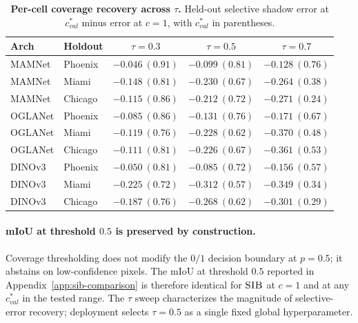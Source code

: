 \begin{table}[h]
\centering
\scriptsize
\setlength{\tabcolsep}{4pt}
\caption{\textbf{Per-cell coverage recovery across $\tau$.} Held-out selective shadow error at $c^*_{val}$ minus error at $c = 1$, with $c^*_{val}$ in parentheses.}
\label{tab:tau-percell}
\begin{tabular}{ll|ccc}
\toprule
\textbf{Arch} & \textbf{Holdout} & $\tau = 0.3$ & $\tau = 0.5$ & $\tau = 0.7$ \\
\midrule
MAMNet  & Phoenix & $-0.046\ (0.91)$ & $-0.099\ (0.81)$ & $-0.128\ (0.76)$ \\
MAMNet  & Miami   & $-0.148\ (0.81)$ & $-0.230\ (0.67)$ & $-0.264\ (0.38)$ \\
MAMNet  & Chicago & $-0.115\ (0.86)$ & $-0.212\ (0.72)$ & $-0.271\ (0.24)$ \\
OGLANet & Phoenix & $-0.085\ (0.86)$ & $-0.131\ (0.76)$ & $-0.171\ (0.67)$ \\
OGLANet & Miami   & $-0.119\ (0.76)$ & $-0.228\ (0.62)$ & $-0.370\ (0.48)$ \\
OGLANet & Chicago & $-0.111\ (0.81)$ & $-0.226\ (0.67)$ & $-0.361\ (0.53)$ \\
DINOv3  & Phoenix & $-0.050\ (0.81)$ & $-0.085\ (0.72)$ & $-0.156\ (0.57)$ \\
DINOv3  & Miami   & $-0.225\ (0.72)$ & $-0.312\ (0.57)$ & $-0.349\ (0.34)$ \\
DINOv3  & Chicago & $-0.187\ (0.76)$ & $-0.268\ (0.62)$ & $-0.301\ (0.29)$ \\
\bottomrule
\end{tabular}
\end{table}

\paragraph{mIoU at threshold $0.5$ is preserved by construction.} Coverage thresholding does not modify the $0/1$ decision boundary at $p = 0.5$; it abstains on low-confidence pixels. The mIoU at threshold $0.5$ reported in Appendix~\ref{app:sib-comparison} is therefore identical for $\textsc{SIB}{}$ at $c = 1$ and at any $c^*_{val}$ in the tested range. The $\tau$ sweep characterizes the magnitude of selective-error recovery; deployment selects $\tau = 0.5$ as a single fixed global hyperparameter.